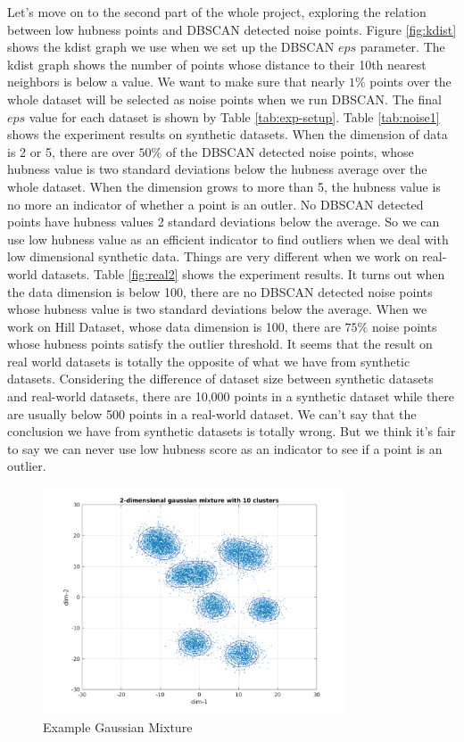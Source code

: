 \documentclass[11pt]{article}
\begin{document}
Let's move on to the second part of the whole project, exploring the relation between low hubness points and DBSCAN detected noise points. Figure \ref{fig:kdist} shows the kdist graph we use when we set up the DBSCAN $eps$ parameter. The kdist graph shows the number of points whose distance to their 10th nearest neighbors is below a value. We want to make sure that nearly $1\%$ points over the whole dataset will be selected as noise points when we run DBSCAN. The final $eps$ value for each dataset is shown by Table \ref{tab:exp-setup}. Table \ref{tab:noise1} shows the experiment results on synthetic datasets. When the dimension of data is 2 or 5, there are over $50\%$ of the DBSCAN detected noise points, whose hubness value is two standard deviations below the hubness average over the whole dataset. When the dimension grows to more than 5, the hubness value is no more an indicator of whether a point is an outler. No DBSCAN detected points have hubness values 2 standard deviations below the average. So we can use low hubness value as an efficient indicator to find outliers when we deal with low dimensional synthetic data. Things are very different when we work on real-world datasets. Table \ref{fig:real2} shows the experiment results. It turns out when the data dimension is below 100, there are no DBSCAN detected noise points whose hubness value is two standard deviations below the average. When we work on Hill Dataset, whose data dimension is 100, there are $75\%$ noise points whose hubness points satisfy the outlier threshold. It seems that the result on real world datasets is totally the opposite of what we have from synthetic datasets. Considering the difference of dataset size between synthetic datasets and real-world datasets, there are 10,000 points in a synthetic dataset while there are usually below 500 points in a real-world dataset. We can't say that the conclusion we have from synthetic datasets is totally wrong. But we think it's fair to say we can never use low hubness score as an indicator to see if a point is an outlier.

\begin{figure}[ht]
	\begin{center}
		\includegraphics[width=0.8\textwidth]{FIGS/example_gaussian_mixture.png}
		\caption{Example Gaussian Mixture}
		\label{fig:example_gm}
	\end{center}
\end{figure}
\end{document}
